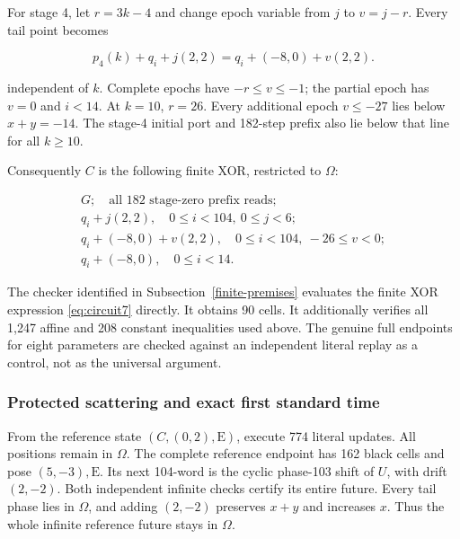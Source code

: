 \documentclass[
  11pt,
]{article}
\begin{document}
For stage 4, let \(r=3k-4\) and change epoch variable from \(j\) to \(v=j-r\). Every
tail point becomes

\begin{equation}\label{eq:circuit6}
p_4(k)+q_i+j(2,2)=q_i+(-8,0)+v(2,2).
\end{equation}

independent of \(k\). Complete epochs have $-r\le v\le-1$; the
partial epoch has \(v=0\) and $i<14$. At \(k=10\), \(r=26\). Every additional
epoch $v\le-27$ lies below \(x+y=-14\). The stage-4 initial port and
182-step prefix also lie below that line for all $k\ge10$.

Consequently \(C\) is the following finite XOR, restricted to \(\Omega\):

\begin{equation}\label{eq:circuit7}
\begin{gathered}G;\quad\text{all 182 stage-zero prefix reads};\\q_i+j(2,2),\quad0\le i<104,\ 0\le j<6;\\q_i+(-8,0)+v(2,2),\quad0\le i<104,\ -26\le v<0;\\q_i+(-8,0),\quad0\le i<14.\end{gathered}
\end{equation}

The checker identified in Subsection~\ref{finite-premises} evaluates
the finite XOR expression \eqref{eq:circuit7} directly. It obtains 90 cells. It additionally verifies all 1,247 affine
and 208 constant inequalities used above. The genuine full endpoints for
eight parameters are checked against an independent literal replay as a
control, not as the universal argument.

\subsubsection{Protected scattering and exact first standard
time}\label{protected-scattering-and-exact-first-standard-time}

From the reference state \((C,(0,2),\mathrm E)\), execute 774 literal updates. All
positions remain in \(\Omega\). The complete reference endpoint has 162 black
cells and pose \((5,-3),\mathrm E\). Its next 104-word is the cyclic phase-103 shift
of \(U\), with drift \((2,-2)\). Both independent infinite checks
certify its entire future. Every tail phase lies in \(\Omega\), and adding
\((2,-2)\) preserves \(x+y\) and increases \(x\). Thus the whole infinite reference
future stays in \(\Omega\).
\end{document}

